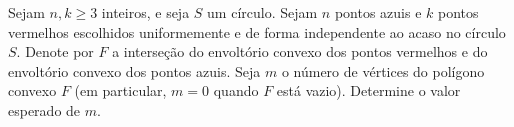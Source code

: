 Sejam \(n,k\ge 3\) inteiros, e seja \(S\) um círculo. Sejam \(n\) pontos azuis e \(k\) pontos vermelhos escolhidos uniformemente e de forma independente ao acaso no círculo \(S\). Denote por \(F\) a interseção do envoltório convexo dos pontos vermelhos e do envoltório convexo dos pontos azuis. Seja \(m\) o número de vértices do polígono convexo \(F\) (em particular, \(m=0\) quando \(F\) está vazio). Determine o valor esperado de \(m\).
